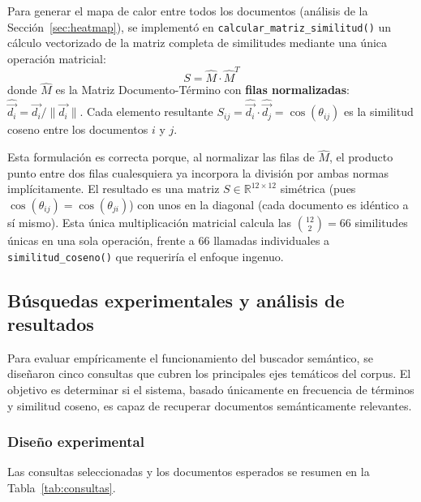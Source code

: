 Para generar el mapa de calor entre todos los documentos (análisis de la Sección~\ref{sec:heatmap}), se implementó en \texttt{calcular\_matriz\_similitud()} un cálculo vectorizado de la matriz completa de similitudes mediante una única operación matricial:
\[
S = \hat{M} \cdot \hat{M}^T
\]
donde $\hat{M}$ es la Matriz Documento-Término con \textbf{filas normalizadas}: $\hat{\vec{d_i}} = \vec{d_i} / \|\vec{d_i}\|$. Cada elemento resultante $S_{ij} = \hat{\vec{d_i}} \cdot \hat{\vec{d_j}} = \cos(\theta_{ij})$ es la similitud coseno entre los documentos $i$ y $j$.

Esta formulación es correcta porque, al normalizar las filas de $\hat{M}$, el producto punto entre dos filas cualesquiera ya incorpora la división por ambas normas implícitamente. El resultado es una matriz $S \in \mathbb{R}^{12 \times 12}$ simétrica (pues $\cos(\theta_{ij}) = \cos(\theta_{ji})$) con unos en la diagonal (cada documento es idéntico a sí mismo). Esta única multiplicación matricial calcula las $\binom{12}{2} = 66$ similitudes únicas en una sola operación, frente a 66 llamadas individuales a \texttt{similitud\_coseno()} que requeriría el enfoque ingenuo.

\subsection{Búsquedas experimentales y análisis de resultados}

Para evaluar empíricamente el funcionamiento del buscador semántico, se diseñaron cinco consultas que cubren los principales ejes temáticos del corpus. El objetivo es determinar si el sistema, basado únicamente en frecuencia de términos y similitud coseno, es capaz de recuperar documentos semánticamente relevantes.

\subsubsection{Diseño experimental}

Las consultas seleccionadas y los documentos esperados se resumen en la Tabla~\ref{tab:consultas}.


